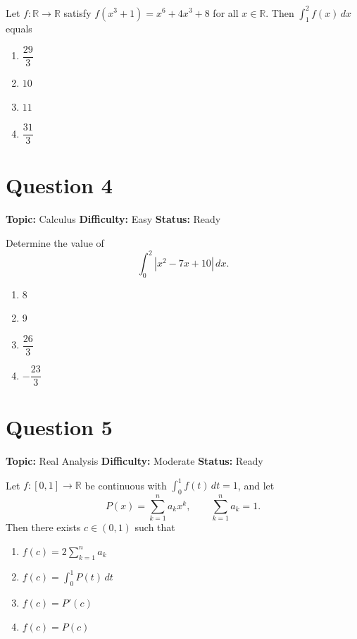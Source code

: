 \documentclass[11pt]{article}
\begin{document}
Let $f:\mathbb{R}\to\mathbb{R}$ satisfy $f(x^3+1) = x^6 + 4x^3 + 8$ for all
$x \in \mathbb{R}$. Then $\displaystyle \int_1^2 f(x)\,dx$ equals
\begin{enumerate}[label=(\Alph*)]
\item $\dfrac{29}{3}$ \item $10$ \item $11$ \item $\dfrac{31}{3}$
\end{enumerate}

\newpage

\section*{Question 4}


\noindent\textbf{Topic:} Calculus \quad \textbf{Difficulty:} Easy \quad \textbf{Status:} Ready



Determine the value of
\[
\int_0^2 |x^2 - 7x + 10|\,dx.
\]
\begin{enumerate}[label=(\Alph*)]
\item 8 \item 9 \item $\dfrac{26}{3}$ \item $-\dfrac{23}{3}$
\end{enumerate}

\newpage

\section*{Question 5}


\noindent\textbf{Topic:} Real Analysis \quad \textbf{Difficulty:} Moderate \quad \textbf{Status:} Ready



Let $f:[0,1]\to\mathbb{R}$ be continuous with $\displaystyle\int_0^1 f(t)\,dt = 1$, and let
\[
P(x) = \sum_{k=1}^n a_k x^k, \qquad \sum_{k=1}^n a_k = 1.
\]
Then there exists $c \in (0,1)$ such that
\begin{enumerate}[label=(\Alph*)]
\item $f(c) = 2\sum_{k=1}^n a_k$
\item $f(c) = \int_0^1 P(t)\,dt$
\item $f(c) = P'(c)$
\item $f(c) = P(c)$
\end{enumerate}
\end{document}
